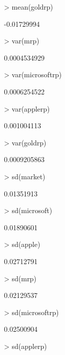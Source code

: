 \documentclass[a4paper]{article}
\begin{document}
\begin{Schunk}
\begin{Sinput}
> mean(goldrp)
\end{Sinput}
\begin{Soutput}
[1] -0.01729994
\end{Soutput}
\begin{Sinput}
> var(mrp)
\end{Sinput}
\begin{Soutput}
[1] 0.0004534929
\end{Soutput}
\begin{Sinput}
> var(microsoftrp)
\end{Sinput}
\begin{Soutput}
[1] 0.0006254522
\end{Soutput}
\begin{Sinput}
> var(applerp)
\end{Sinput}
\begin{Soutput}
[1] 0.001004113
\end{Soutput}
\begin{Sinput}
> var(goldrp)
\end{Sinput}
\begin{Soutput}
[1] 0.0009205863
\end{Soutput}
\begin{Sinput}
> sd(market)
\end{Sinput}
\begin{Soutput}
[1] 0.01351913
\end{Soutput}
\begin{Sinput}
> sd(microsoft)
\end{Sinput}
\begin{Soutput}
[1] 0.01890601
\end{Soutput}
\begin{Sinput}
> sd(apple)
\end{Sinput}
\begin{Soutput}
[1] 0.02712791
\end{Soutput}
\begin{Sinput}
> sd(mrp)
\end{Sinput}
\begin{Soutput}
[1] 0.02129537
\end{Soutput}
\begin{Sinput}
> sd(microsoftrp)
\end{Sinput}
\begin{Soutput}
[1] 0.02500904
\end{Soutput}
\begin{Sinput}
> sd(applerp)
\end{Sinput}

\end{Schunk}
\end{document}
